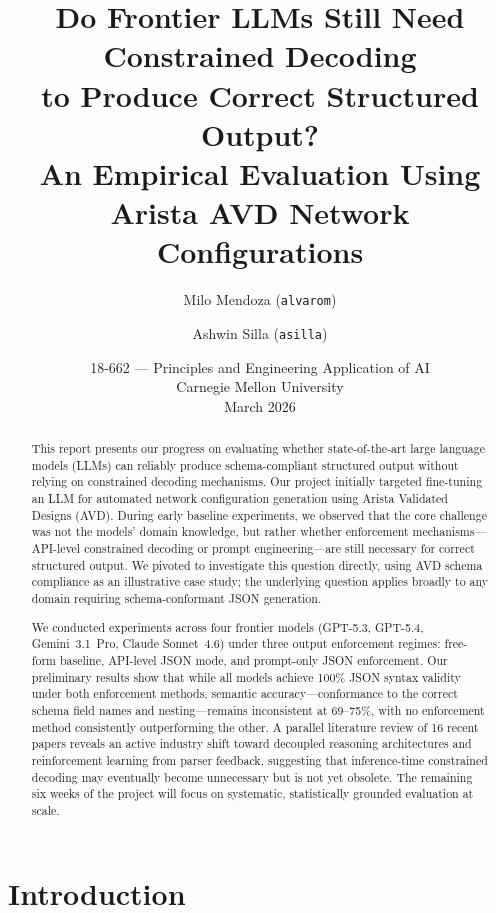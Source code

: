 \documentclass[11pt, letterpaper]{article}
\title{
    \vspace{-1.5cm}
    \Large \textbf{Do Frontier LLMs Still Need Constrained Decoding\\
    to Produce Correct Structured Output?}\\[6pt]
    \large An Empirical Evaluation Using Arista AVD Network Configurations
}
\author{
    Milo Mendoza (\texttt{alvarom})
    \and 
    Ashwin Silla (\texttt{asilla})
}
\date{
    18-662 --- Principles and Engineering Application of AI\\
    Carnegie Mellon University\\[4pt]
    March 2026
}
\begin{document}
\maketitle
\thispagestyle{fancy}

\begin{abstract}
This report presents our progress on evaluating whether state-of-the-art large language models (LLMs) can reliably produce schema-compliant structured output without relying on constrained decoding mechanisms. Our project initially targeted fine-tuning an LLM for automated network configuration generation using Arista Validated Designs (AVD). During early baseline experiments, we observed that the core challenge was not the models' domain knowledge, but rather whether enforcement mechanisms---API-level constrained decoding or prompt engineering---are still necessary for correct structured output. We pivoted to investigate this question directly, using AVD schema compliance as an illustrative case study; the underlying question applies broadly to any domain requiring schema-conformant JSON generation.

We conducted experiments across four frontier models (GPT-5.3, GPT-5.4, Gemini~3.1~Pro, Claude Sonnet~4.6) under three output enforcement regimes: free-form baseline, API-level JSON mode, and prompt-only JSON enforcement. Our preliminary results show that while all models achieve 100\% JSON syntax validity under both enforcement methods, semantic accuracy---conformance to the correct schema field names and nesting---remains inconsistent at 69--75\%, with no enforcement method consistently outperforming the other. A parallel literature review of 16 recent papers \cite{causal_inference, crane, rl_json} reveals an active industry shift toward decoupled reasoning architectures and reinforcement learning from parser feedback, suggesting that inference-time constrained decoding may eventually become unnecessary but is not yet obsolete. The remaining six weeks of the project will focus on systematic, statistically grounded evaluation at scale.
\end{abstract}

\section{Introduction}
\label{sec:introduction}
\end{document}
